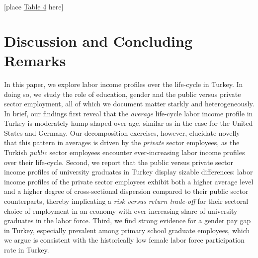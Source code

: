 \documentclass[12pt,author-year]{article}
\begin{document}
\begin{center}
	[place \hyperref[table4]{Table 4} here]
\end{center}



%
%
%



\section{Discussion and Concluding Remarks}
\label{Section5}

In this paper, we explore labor income profiles over the life-cycle in Turkey. In doing so, we study the role of education, gender and the public versus private sector employment, all of which we document matter starkly and heterogeneously. In brief, our findings first reveal that the \emph{average} life-cycle labor income profile in Turkey is moderately hump-shaped over age, similar as in the case for the United States and Germany. Our decomposition exercises, however, elucidate novelly that this pattern in averages is driven by the \emph{private} sector employees, as the Turkish \emph{public} sector employees encounter ever-increasing labor income profiles over their life-cycle. Second, we report that the public versus private sector income profiles of university graduates in Turkey display sizable differences: labor income profiles of the private sector employees exhibit both a higher average level and a higher degree of cross-sectional dispersion compared to their public sector counterparts, thereby implicating a \emph{risk versus return trade-off} for their sectoral choice of employment in an economy with ever-increasing share of university graduates in the labor force. Third, we find strong evidence for a gender pay gap in Turkey, especially prevalent among primary school graduate employees, which we argue is consistent with the historically low female labor force participation rate in Turkey. 
\end{document}
